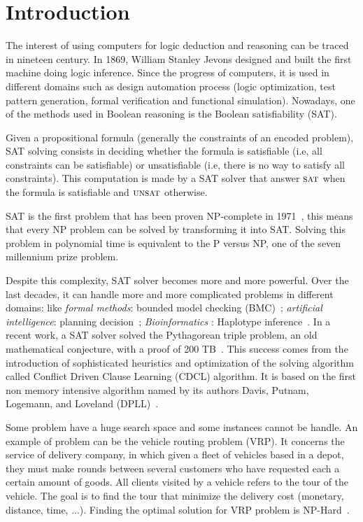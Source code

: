 \chapter{Introduction}\label{chap:intro}


The interest of using computers for logic deduction and reasoning can be traced in nineteen century.
In 1869,  William Stanley Jevons designed and built the first machine doing logic inference.
Since the progress of computers, it is used in different domains such as design automation process 
(logic optimization, test pattern generation, formal verification and functional simulation).
Nowadays, one of the methods used in Boolean reasoning is the Boolean satisfiability (SAT).

Given a propositional formula (generally the constraints of an encoded problem),
SAT solving consists in deciding whether the formula is satisfiable (i.e, all constraints can be
satisfiable) or unsatisfiable (i.e, there is no way to satisfy all constraints).
This computation is made by a SAT solver that answer $\textsc{sat}$ when the formula is satisfiable
and $\textsc{unsat}$ otherwise.

SAT is the first problem that has been proven NP-complete in 1971~\cite{cook1971complexity}, this 
means that every NP problem can be solved by transforming it into SAT. Solving this problem in 
polynomial time is equivalent to the P versus NP, one of the seven millennium prize problem.


Despite this complexity, SAT solver becomes more and more powerful.
Over the last decades, it can handle more and more complicated problems in different domains:
like \emph{formal methods}: bounded model checking (BMC)~\cite{bmc_99}; \emph{artificial intelligence}: planning decision~\cite{planning_92}; \emph{Bioinformatics} : Haplotype inference~\cite{biology_06}.
In a recent work, a SAT solver solved the Pythagorean triple problem, an old mathematical conjecture,
with a proof of 200 TB~\cite{heule2016solving}.
This success comes from the introduction of sophisticated heuristics and optimization of the solving 
algorithm called Conflict Driven Clause Learning (CDCL) algorithm. It is based on the first non memory
intensive algorithm named by its authors Davis, Putnam, Logemann, and Loveland (DPLL)~\cite{dpll_62}.



Some problem have a huge search space and some instances cannot be handle.
An example of problem can be the vehicle routing problem (VRP).
It concerns the service of delivery company, in which
given a fleet of vehicles based in a depot, they must make rounds between several customers  who have requested
each a certain amount of goods. All clients visited by a vehicle refers to the tour of the vehicle. 
The goal is to find the tour that minimize the delivery cost (monetary, distance, time, ...).
Finding the optimal solution for VRP problem is NP-Hard~\cite{toth2002vehicle}.

